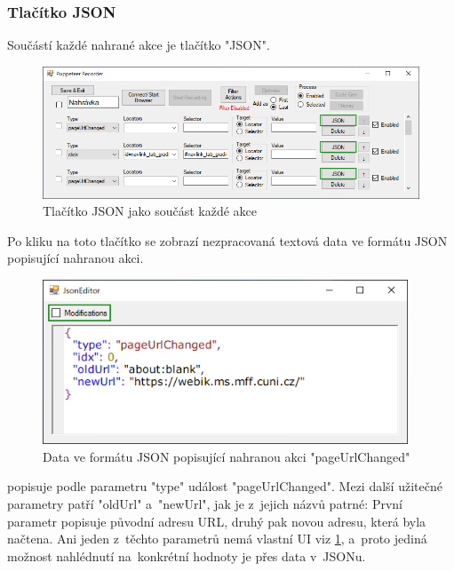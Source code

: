 \documentclass[12pt, a4paper, twoside]{article}
\begin{document}
	\subsubsection{Tlačítko JSON}
	\label{subsub_sec:jsonTutorial}
	Součástí každé nahrané akce je tlačítko "JSON". 
	\nopagebreak
	\begin{figure}[H]
		\centering
		\includegraphics[width=1.0\textwidth]{jsonButton.png}
		\caption{Tlačítko JSON jako součást každé akce}
		\label{fig:jsonButtonHighlight}
	\end{figure}
	Po kliku na toto tlačítko se zobrazí nezpracovaná textová data ve formátu JSON popisující nahranou akci.
	\begin{figure}[H]
		\centering
		\includegraphics[width=0.97\textwidth]{jsonEditor.png}
		\caption{Data ve formátu JSON popisující nahranou akci "pageUrlChanged"}
		\label{fig:jsonEditor}
	\end{figure}
	 popisuje podle parametru "type" událost "pageUrlChanged". Mezi další užitečné parametry patří "oldUrl" a~"newUrl", jak je z~jejich názvů patrné: První parametr popisuje původní adresu URL, druhý pak novou adresu, která byla načtena. Ani jeden z~těchto parametrů nemá vlastní UI viz \cref{fig:jsonButtonHighlight}, a~proto jediná možnost nahlédnutí na~konkrétní hodnoty je přes data v~JSONu.
	
\end{document}
